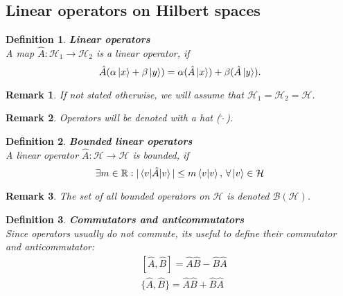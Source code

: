 \documentclass[12pt, a4paper]{article}
\newtheorem{definition}{Definition}
\newtheorem{remark}{Remark}
\begin{document}
\subsection{Linear operators on Hilbert spaces}

\begin{definition}
    \textbf{Linear operators}\\
    A map $\hat A: \mathcal H_1 \rightarrow \mathcal H_2$ is a linear operator, if 
    \begin{equation*}
        \hat A (\alpha\ket x + \beta\ket y) = \alpha (\hat A \ket x) + \beta (\hat A \ket y).
    \end{equation*}
\end{definition}

\begin{remark}
    If not stated otherwise, we will assume that $\mathcal H_1 = \mathcal H_2 = \mathcal H$.
\end{remark}

\begin{remark}
    Operators will be denoted with a hat ($\hat{\cdot}$).
\end{remark}

\begin{definition}
    \textbf{Bounded linear operators}\\
    A linear operator $\hat A: \mathcal H \rightarrow \mathcal H$ is bounded, if 
    \begin{equation*}
        \exists m \in \mathbb R : |\braket{v|\hat A | v}| \leq m\braket{v|v},\, \forall \ket v \in \mathcal H
    \end{equation*}
\end{definition}

\begin{remark}
    The set of all bounded operators on $\mathcal H$ is denoted $\mathcal{B(H)}$.
\end{remark}


\begin{definition}
    \textbf{Commutators and anticommutators}\\
    Since operators usually do not commute, its useful to define their commutator and anticommutator:
    \begin{align*}
        &[\hat A, \hat B] = \hat A\hat B - \hat B\hat A\\
        &\{\hat A, \hat B\} = \hat A\hat B + \hat B\hat A
    \end{align*}
\end{definition}
\end{document}

